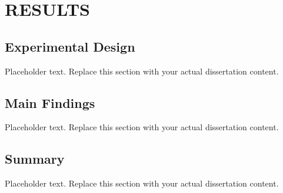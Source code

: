 
\chapter{RESULTS}

\section{Experimental Design}
Placeholder text. Replace this section with your actual dissertation content.

\section{Main Findings}
Placeholder text. Replace this section with your actual dissertation content.

\section{Summary}
Placeholder text. Replace this section with your actual dissertation content.
